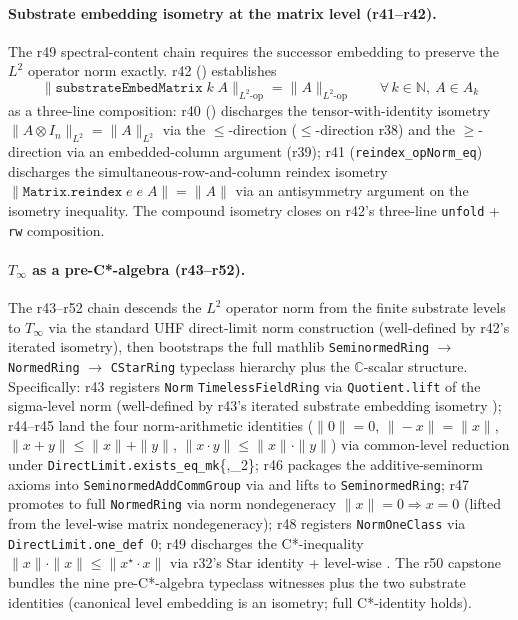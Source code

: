\documentclass[11pt,a4paper]{amsart}
\theoremstyle{plain}
\theoremstyle{definition}
\begin{document}
\paragraph{Substrate embedding isometry at the matrix level (r41--r42).} The r49 spectral-content chain requires the successor embedding to preserve the $L^2$ operator norm exactly. r42 () establishes
\[
\bigl\|\texttt{substrateEmbedMatrix}\;k\;A\bigr\|_{L^2\text{-op}} = \|A\|_{L^2\text{-op}} \qquad \forall\, k \in \mathbb{N},\ A \in A_k
\]
as a three-line composition: r40 () discharges the tensor-with-identity isometry $\|A \otimes I_n\|_{L^2} = \|A\|_{L^2}$ via the $\le$-direction ($\le$-direction r38) and the $\ge$-direction via an embedded-column argument (r39); r41 (\texttt{reindex\_opNorm\_eq}) discharges the simultaneous-row-and-column reindex isometry $\|\texttt{Matrix.reindex}\;e\;e\;A\| = \|A\|$ via an antisymmetry argument on the isometry inequality. The compound isometry closes on r42's three-line \texttt{unfold} + \texttt{rw} composition.

\paragraph{$T_\infty$ as a pre-C*-algebra (r43--r52).} The r43--r52 chain descends the $L^2$ operator norm from the finite substrate levels to $T_\infty$ via the standard UHF direct-limit norm construction (well-defined by r42's iterated isometry), then bootstraps the full mathlib \texttt{SeminormedRing} $\to$ \texttt{NormedRing} $\to$ \texttt{CStarRing} typeclass hierarchy plus the $\mathbb{C}$-scalar structure. Specifically: r43 registers \texttt{Norm} \texttt{TimelessFieldRing} via \texttt{Quotient.lift} of the sigma-level norm (well-defined by r43's iterated substrate embedding isometry ); r44--r45 land the four norm-arithmetic identities ($\|0\|=0$, $\|-x\|=\|x\|$, $\|x+y\| \le \|x\|+\|y\|$, $\|x \cdot y\| \le \|x\|\cdot\|y\|$) via common-level reduction under \texttt{DirectLimit.exists\_eq\_mk}\{,\_2\}; r46 packages the additive-seminorm axioms into \texttt{SeminormedAddCommGroup} via  and lifts to \texttt{SeminormedRing}; r47 promotes to full \texttt{NormedRing} via norm nondegeneracy $\|x\|=0 \Rightarrow x=0$ (lifted from the level-wise matrix nondegeneracy); r48 registers \texttt{NormOneClass} via \texttt{DirectLimit.one\_def}~$0$; r49 discharges the C*-inequality  $\|x\|\cdot\|x\| \le \|x^\star \cdot x\|$ via r32's Star identity + level-wise . The r50 capstone bundles the nine pre-C*-algebra typeclass witnesses plus the two substrate identities (canonical level embedding is an isometry; full C*-identity holds).
\end{document}
